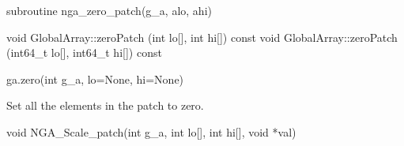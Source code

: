 \documentclass[10pt]{article}
\begin{document}
\begin{fapi}
\begin{fcode}
subroutine nga_zero_patch(g_a, alo, ahi)
\end{fcode}
\begin{funcargs}
\end{funcargs}
\end{fapi}

\begin{cxxapi}
\begin{cxxcode}
void GlobalArray::zeroPatch (int lo[], int hi[]) const
void GlobalArray::zeroPatch (int64_t lo[], int64_t hi[]) const
\end{cxxcode}
\begin{funcargs}
\end{funcargs}
\end{cxxapi}

\begin{pyapi}
\begin{pycode}
ga.zero(int g_a, lo=None, hi=None)
\end{pycode}
\begin{funcargs}
\end{funcargs}
\end{pyapi}

\gcoll

\begin{desc}

Set all the elements in the patch to zero.

\end{desc}




\begin{capi}
\begin{ccode}
void NGA_Scale_patch(int g_a, int lo[], int hi[], void *val)
\end{ccode}
\begin{funcargs}
\end{funcargs}
\end{capi}
\end{document}

